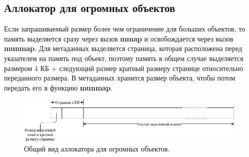 \subsection{Аллокатор для огромных объектов}
Если запрашиваемый размер более чем ограничение для больших объектов, то память выделяется сразу через вызов \textbf{mmap} и освобождается через вызов \textbf{munmap}. Для метаданных выделяется страница, которая расположена перед указателем на память под объект, поэтому память в общем случае выделяется размером 4 КБ + следующий размер кратный размеру странице относительно переданного размера. В метаданных хранится размер объекта, чтобы потом передать его в функцию \textbf{munmap}.

\begin{figure}[!h]
	\begin{center}
		\includegraphics[scale=0.5]{images/huge-allocator-design.png}
		\caption{Общий вид аллокатора для огромных объектов.}
		\label{huge-allocator-design}
	\end{center}
\end{figure}
